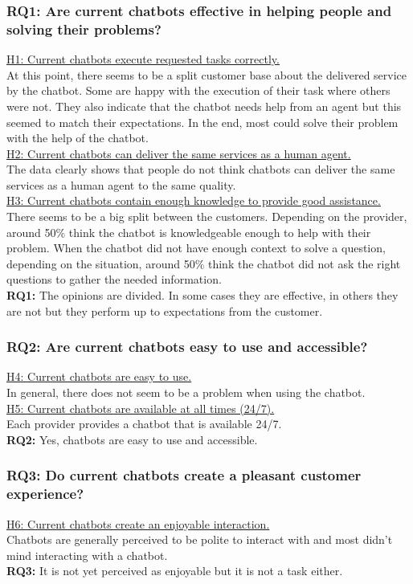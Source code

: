 \subsubsection{RQ1: Are current chatbots effective in helping people and
	solving their problems?}
\ul{H1: Current chatbots execute requested tasks correctly.}\\
At this point, there seems to be a split customer base about the delivered service by the chatbot. Some are happy with the execution of their task where others were not. They also indicate that the chatbot needs help from an agent but this seemed to match their expectations. In the end, most could solve their problem with the help of the chatbot.\\
\break
\ul{H2: Current chatbots can deliver the same services as a human
	agent.}\\
The data clearly shows that people do not think chatbots can deliver the same services as a human agent to the same quality.\\
\break
\ul{H3: Current chatbots contain enough knowledge to provide good
	assistance.}\\
There seems to be a big split between the customers. Depending on the provider, around 50\% think the chatbot is knowledgeable enough to help with their problem. When the chatbot did not have enough context to solve a question, depending on the situation, around 50\% think the chatbot did not ask the right questions to gather the needed information.\\
\break
\textbf{RQ1:} The opinions are divided. In some cases they are effective, in others they are not but they perform up to expectations from the customer.\\
\subsubsection{RQ2: Are current chatbots easy to use and accessible?}
\ul{H4: Current chatbots are easy to use.}\\
In general, there does not seem to be a problem when using the chatbot.\\
\break
\ul{H5: Current chatbots are available at all times (24/7).}\\
Each provider provides a chatbot that is available 24/7.\\
\break
\textbf{RQ2:} Yes, chatbots are easy to use and accessible.\\
\subsubsection{RQ3: Do current chatbots create a pleasant customer experience?}
\ul{H6: Current chatbots create an enjoyable interaction.}\\
Chatbots are generally perceived to be polite to interact with and most didn't mind interacting with a chatbot.\\
\break
\textbf{RQ3:} It is not yet perceived as enjoyable but it is not a task either.

